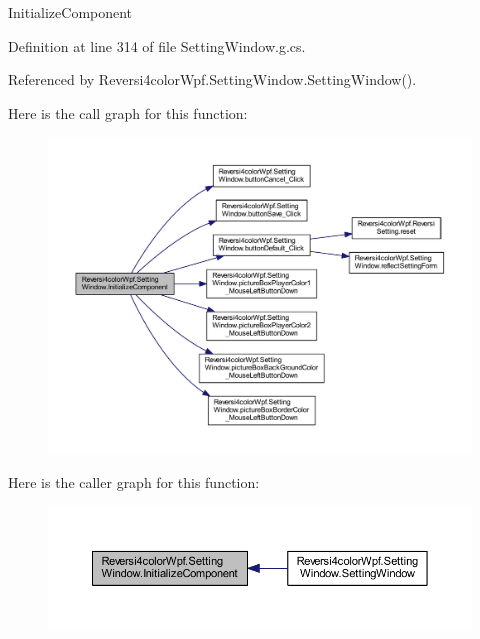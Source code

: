 Initialize\+Component 



Definition at line 314 of file Setting\+Window.\+g.\+cs.



Referenced by Reversi4color\+Wpf.\+Setting\+Window.\+Setting\+Window().

Here is the call graph for this function\+:
\nopagebreak
\begin{figure}[H]
\begin{center}
\leavevmode
\includegraphics[width=350pt]{class_reversi4color_wpf_1_1_setting_window_ac85da370c146e04c94ae2535845b603f_cgraph}
\end{center}
\end{figure}
Here is the caller graph for this function\+:
\nopagebreak
\begin{figure}[H]
\begin{center}
\leavevmode
\includegraphics[width=350pt]{class_reversi4color_wpf_1_1_setting_window_ac85da370c146e04c94ae2535845b603f_icgraph}
\end{center}
\end{figure}
\mbox{\label{class_reversi4color_wpf_1_1_setting_window_ac85da370c146e04c94ae2535845b603f}} 
